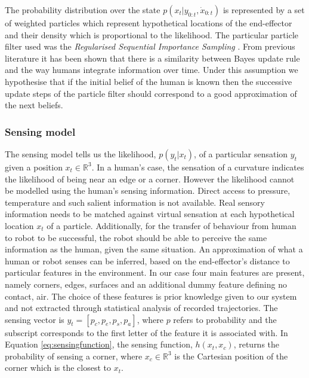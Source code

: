The probability distribution over the state $p(x_{t}|y_{0:t},\dot{x}_{0:t})$ is represented by a set of weighted particles which represent hypothetical
locations of the end-effector and  their density which is proportional to the likelihood. The particular particle filter used was the 
\textit{Regularised Sequential Importance Sampling} \cite[p.182]{Arul_Mask_Clap_2002}. From previous literature \cite{Bake_Saxe_Tene_2011} 
it has been shown that there is a similarity between Bayes update rule and the way humans integrate information over time. Under this assumption we hypothesise that if the initial belief of the human is known then the successive update steps of the particle filter should correspond to a good approximation 
of the next beliefs. 

\subsubsection{Sensing model}

The sensing model tells us the likelihood, $p(y_t|x_t)$, of a particular sensation $y_t$ given
a position $x_t \in \mathbb{R}^{3}$. In a human's case, the sensation of a curvature indicates the 
likelihood of being near an edge or a corner. However the likelihood cannot be modelled using 
the human's sensing information. Direct access to pressure, temperature and such salient information is not available. 
Real sensory information needs to be matched against virtual sensation at each hypothetical location $x_t$ of a particle. 
Additionally,  for the transfer of behaviour from human to robot to be successful, the robot should be
able to perceive the same information as the human, given the same situation. An approximation of what a human or robot senses 
can be inferred, based on the end-effector's distance to particular features in the environment. In our case four main features 
are present, namely corners, edges, surfaces and an additional dummy feature defining no contact, air. The choice of these features is prior knowledge 
given to our system and not extracted through statistical analysis of recorded trajectories. The sensing vector is $y_t = \left[p_c,p_e,p_s,p_a\right]$, 
where $p$ refers to probability and the subscript corresponds to the first letter of the feature it is associated with. In Equation \ref{eq:sensingfunction}, 
the sensing function, $h(x_t,x_c)$, returns the probability of sensing a corner, where $x_c \in \mathbb{R}^3$ is the Cartesian position of the corner which is
the closest to $x_t$. 

